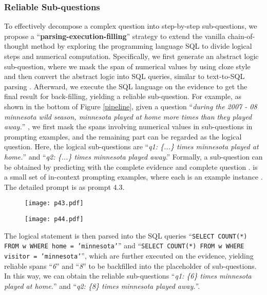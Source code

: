 \documentclass{article}
\begin{document}
\subsubsection{Reliable Sub-questions}
To effectively decompose a complex question into step-by-step sub-questions, we propose a ``\textbf{parsing-execution-filling}'' strategy to extend the vanilla chain-of-thought method by exploring the programming language SQL to divide logical steps and numerical computation. 
Specifically, we first generate an abstract logic sub-question, where we mask the span of numerical values by using cloze style and then convert the abstract logic into SQL queries, similar to text-to-SQL parsing \citep{Qin2022ASO,Wang2022ProtonPS}. 
Afterward, we execute the SQL language on the evidence to get the final result for back-filling, yielding a reliable sub-question.
For example, as shown in the bottom of Figure \ref{pipeline}, given a question 
``\textit{during the 2007 - 08 minnesota wild season, minnesota played at home more times than they played away.}''
, we first mask the spans involving numerical values in sub-questions in prompting examples, and the remaining part can be regarded as the logical question. Here, the logical sub-questions are 
``\textit{q1: \{...\} times minnesota played at home.}'' and ``\textit{q2: \{...\} times minnesota played away}.'' Formally, a sub-question  can be obtained by predicting  with the complete evidence  and complete question . 
 is a small set of in-context prompting examples, where each  is an example instance .
The detailed prompt is as prompt 4.3.
\begin{figure}[htbp]
\centering
\begin{minipage}[t]{0.48\textwidth}
\centering
\texttt{[image: p43.pdf]}
\end{minipage}
\begin{minipage}[t]{0.48\textwidth}
\centering
\texttt{[image: p44.pdf]}
\end{minipage}
\end{figure}



The logical statement is then parsed into the SQL queries ``\texttt{SELECT COUNT(*) FROM w WHERE home = 'minnesota'}'' and 
``\texttt{SELECT COUNT(*) FROM w WHERE visitor = 'minnesota'}'',
which are further executed on the evidence, yielding reliable spans ``\textit{6}'' and ``\textit{8}'' to be backfilled into the placeholder  of sub-questions. In this way, we can obtain the reliable sub-questions 
``\textit{q1: \{6\} times minnesota played at home.}''
and ``\textit{q2: \{8\} times minnesota played away.}''. 
\end{document}
